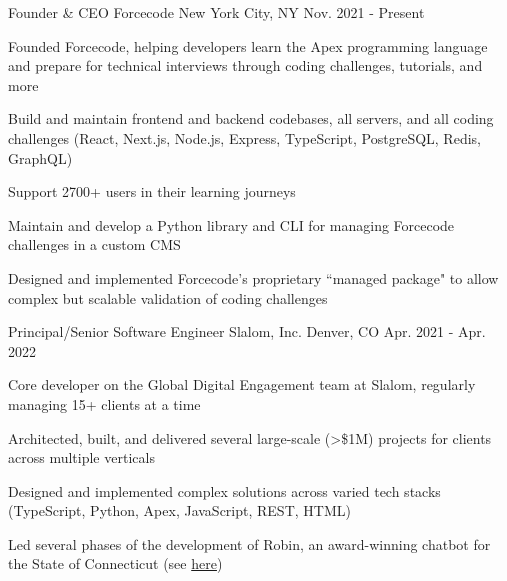 \begin{cventries}
  \cventry
    {Founder \& CEO} %
    {Forcecode} %
    {New York City, NY} %
    {Nov. 2021 - Present} %
    {
      \begin{cvitems} %
        \item {Founded Forcecode, helping developers learn the Apex programming language and prepare for technical interviews through coding challenges, tutorials, and more}
        \item {Build and maintain frontend and backend codebases, all servers, and all coding challenges (React, Next.js, Node.js, Express, TypeScript, PostgreSQL, Redis, GraphQL)}
        \item {Support 2700+ users in their learning journeys}
        \item {Maintain and develop a Python library and CLI for managing Forcecode challenges in a custom CMS}
        \item {Designed and implemented Forcecode's proprietary ``managed package" to allow complex but scalable validation of coding challenges}
      \end{cvitems}
    }


  \cventry
    {Principal/Senior Software Engineer} %
    {Slalom, Inc.} %
    {Denver, CO} %
    {Apr. 2021 - Apr. 2022} %
    {
      \begin{cvitems} %
        \item {Core developer on the Global Digital Engagement team at Slalom, regularly managing 15+ clients at a time}
        \item {Architected, built, and delivered several large-scale (>\$1M) projects for clients across multiple verticals}
        \item {Designed and implemented complex solutions across varied tech stacks (TypeScript, Python, Apex, JavaScript, REST, HTML)}
        \item {Led several phases of the development of Robin, an award-winning chatbot for the State of Connecticut (see \href{https://portal.ct.gov/das/dasblog/das-team-wins-government-experience-award}{\color{awesome-skyblue}here})}
      \end{cvitems}
    }


\end{cventries}
